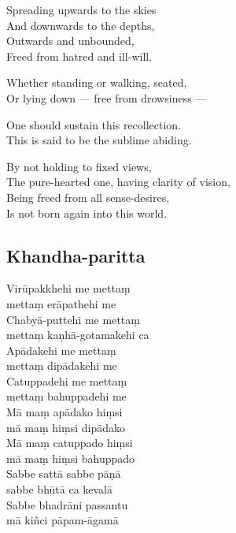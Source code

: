 Spreading upwards to the skies\\
And downwards to the depths,\\
Outwards and unbounded,\\
Freed from hatred and ill-will.

Whether standing or walking, seated, \\
Or lying down --- free from drowsiness ---

\clearpage

One should sustain this recollection.\\
This is said to be the sublime abiding.

By not holding to fixed views,\\
The pure-hearted one, having clarity of vision,\\
Being freed from all sense-desires,\\
Is not born again into this world. 

\subsection{Khandha-paritta}
\label{virupakkhehi}


\enlargethispage{\baselineskip}

Virūpakkhehi me mettaṃ\\\vin mettaṃ erāpathehi me\\
Chabyā-puttehi me mettaṃ\\\vin mettaṃ kaṇhā-gotamakehi ca\\
Apādakehi me mettaṃ\\\vin mettaṃ dipādakehi me\\
Catuppadehi me mettaṃ\\\vin mettaṃ bahuppadehi me\\
Mā maṃ apādako hiṃsi\\\vin mā maṃ hiṃsi dipādako\\
Mā maṃ catuppado hiṃsi\\\vin mā maṃ hiṃsi bahuppado\\
Sabbe sattā sabbe pāṇā\\\vin sabbe bhūtā ca kevalā\\
Sabbe bhadrāni passantu\\\vin mā kiñci pāpam-āgamā

\clearpage


